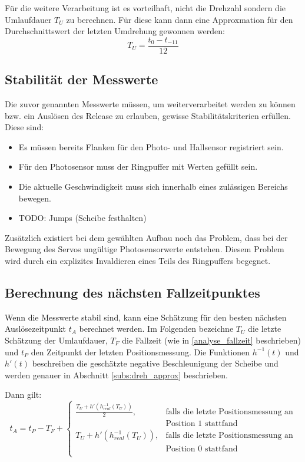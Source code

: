 Für die weitere Verarbeitung ist es vorteilhaft, nicht die Drehzahl sondern die Umlaufdauer $T_U$ zu berechnen.
Für diese kann dann eine Approxmation für den Durchschnittswert der letzten Umdrehung gewonnen werden:
\begin{equation*}
T_U = \frac{t_0 - t_{-11}}{12}
\end{equation*}

\subsection{Stabilität der Messwerte}\label{design_stabilitaet}
Die zuvor genannten Messwerte müssen, um weiterverarbeitet werden zu können bzw. ein Auslösen des Release zu erlauben, gewisse Stabilitätskriterien erfüllen.
Diese sind:
\begin{itemize}
	\item Es müssen bereits Flanken für den Photo- und Hallsensor registriert sein.
	\item Für den Photosensor muss der Ringpuffer mit Werten gefüllt sein.
	\item Die aktuelle Geschwindigkeit muss sich innerhalb eines zulässigen Bereichs bewegen.
	\item TODO: Jumps (Scheibe festhalten)
\end{itemize}

Zusätzlich existiert bei dem gewählten Aufbau noch das Problem, dass bei der Bewegung des Servos ungültige Photosensorwerte entstehen.
Diesem Problem wird durch ein explizites Invaldieren eines Teils des Ringpuffers begegnet.

\subsection{Berechnung des nächsten Fallzeitpunktes}\label{design_zeitpunkt}
Wenn die Messwerte stabil sind, kann eine Schätzung für den besten nächsten Auslösezeitpunkt $t_A$ berechnet werden.
Im Folgenden bezeichne $T_U$ die letzte Schätzung der Umlaufdauer, $T_F$ die Fallzeit (wie in \cref{analyse_fallzeit} beschrieben) und $t_P$ den Zeitpunkt der letzten Positionsmessung.
Die Funktionen $h^{-1}(t)$ und $h'(t)$ beschreiben die geschätzte negative Beschleunigung der Scheibe und werden genauer in Abschnitt \ref{subs:dreh_approx} beschrieben.

Dann gilt:
\begin{equation*}
t_A = t_P - T_F +
\begin{cases}
	\frac{T_U + h'(h^{-1}_{real}(T_U))}{2} , & \text{falls die letzte Positionsmessung an}\\
	&  \text{Position 1 stattfand}\\
	T_U + h'(h^{-1}_{real}(T_U)), & \text{falls die letzte Positionsmessung an}\\
	&  \text{Position 0 stattfand}\\

\end{cases}
\end{equation*}

